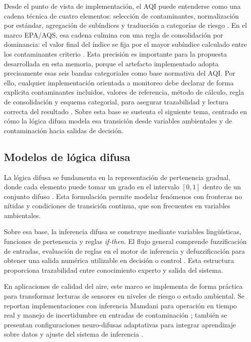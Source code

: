Desde el punto de vista de implementación, el AQI puede entenderse como una cadena técnica de cuatro elementos: selección de contaminantes, normalización por estándar, agregación de subíndices y traducción a categorías de riesgo \cite{ART01,ART02}. En el marco EPA/AQS, esa cadena culmina con una regla de consolidación por dominancia: el valor final del índice se fija por el mayor subíndice calculado entre los contaminantes criterio \cite{DATA_EPA_AQI_TAD,DATA_EPA_AQS_BREAKPOINTS}. Esta precisión es importante para la propuesta desarrollada en esta memoria, porque el artefacto implementado adopta precisamente esas seis bandas categoriales como base normativa del AQI. Por ello, cualquier implementación orientada a monitoreo debe declarar de forma explícita contaminantes incluidos, valores de referencia, método de cálculo, regla de consolidación y esquema categorial, para asegurar trazabilidad y lectura correcta del resultado \cite{ART01,ART02}. Sobre esta base se sustenta el siguiente tema, centrado en cómo la lógica difusa modela esa transición desde variables ambientales y de contaminación hacia salidas de decisión.




\subsection{Modelos de lógica difusa}
La lógica difusa se fundamenta en la representación de pertenencia gradual, donde cada elemento puede tomar un grado en el intervalo \([0,1]\) dentro de un conjunto difuso \cite{ART03,ARTFZ01,ARTFZ02}. Esta formulación permite modelar fenómenos con fronteras no nítidas y condiciones de transición continua, que son frecuentes en variables ambientales.

Sobre esa base, la inferencia difusa se construye mediante variables lingüísticas, funciones de pertenencia y reglas \textit{if-then}. El flujo general comprende fuzzificación de entradas, evaluación de reglas en el motor de inferencia y defuzzificación para obtener una salida numérica utilizable en decisión o control \cite{ART07,ARTFZ02}. Esta estructura proporciona trazabilidad entre conocimiento experto y salida del sistema.

En aplicaciones de calidad del aire, este marco se implementa de forma práctica para transformar lecturas de sensores en niveles de riesgo o estado ambiental. Se reportan implementaciones con inferencia Mamdani para operación en tiempo real y manejo de incertidumbre en entradas de contaminación \cite{ART06}; también se presentan configuraciones neuro-difusas adaptativas para integrar aprendizaje sobre datos y ajuste del sistema de inferencia \cite{ART04}.

